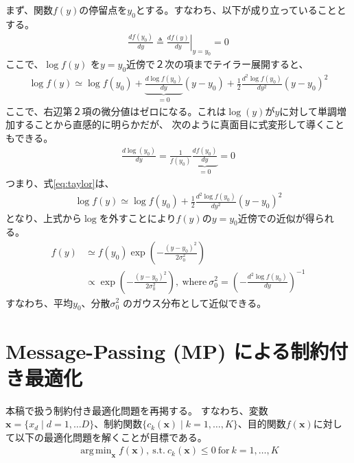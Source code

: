 \documentclass[oneside,onecolumn]{jlreq}
\DeclareMathOperator*{\argmin}{arg\,min}
\theoremstyle{plain}
\begin{document}
まず、関数$f\left(y\right)$の停留点を$y_0$とする。すなわち、以下が成り立っていることとする。
\begin{align}
    \frac{df\left(y_0\right)}{dy} \triangleq \left. \frac{df\left(y\right)}{dy}\right|_{y=y_0} = 0
\end{align}
ここで、$\log f\left(y\right)$ を$y=y_0$近傍で２次の項までテイラー展開すると、
\begin{align}
    \log f\left(y\right) \simeq \log f\left(y_0\right) +
    \underbrace{\frac{d\log f\left(y_0\right)}{dy}}_{=0}\left(y-y_0\right) +
    \frac{1}{2}\frac{d^2\log f\left(y_0\right)}{dy^2}\left(y-y_0\right)^2
    \label{eq:taylor}
\end{align}
ここで、右辺第２項の微分値はゼロになる。これは$\log\left(y\right)$が$y$に対して単調増加することから直感的に明らかだが、
次のように真面目に式変形して導くこともできる。
\begin{align}
    \frac{d\log\left(y_0\right)}{dy} =
    \frac{1}{f\left(y_0\right)}\underbrace{\frac{df\left(y_0\right)}{dy}}_{=0} = 0
\end{align}
つまり、式\eqref{eq:taylor}は、
\begin{align}
    \log f\left(y\right) \simeq \log f\left(y_0\right) +
    \frac{1}{2}\frac{d^2\log f\left(y_0\right)}{dy^2}\left(y-y_0\right)^2
\end{align}
となり、上式から$\log$を外すことにより$f\left(y\right)$の$y=y_0$近傍での近似が得られる。
\begin{align}
    f\left(y\right) &\simeq f\left(y_0\right)\exp\left(-\frac{(y-y_0)^2}{2\sigma_0^2}\right) \\
    &\propto \exp\left(-\frac{(y-y_0)^2}{2\sigma_0^2}\right),~\textrm{where}~\sigma_0^2=\left(-\frac{d^2\log f\left(y_0\right)}{dy}\right)^{-1}
\end{align}
すなわち、平均$y_0$、分散$\sigma_0^2$ のガウス分布として近似できる。

\newpage
\section{Message-Passing (MP) による制約付き最適化}
本稿で扱う制約付き最適化問題を再掲する。
すなわち、変数$\bm{x}=\{x_d\mid d=1,\ldots D\}$、制約関数$\{c_k(\bm{x})\mid k=1,\ldots,K\}$、目的関数$f(\bm{x})$に対して以下の最適化問題を解くことが目標である。
\begin{align}
    \argmin_{\bm{x}} f(\bm{x}),~\text{s.t.}~c_k(\bm{x})\leq 0~\text{for}~k=1,\ldots,K
    \label{eq:opt}
\end{align}
\end{document}
